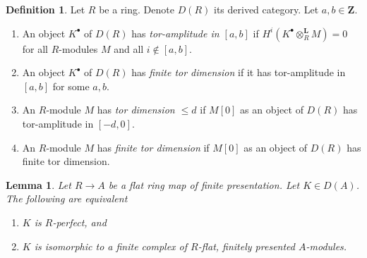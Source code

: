 \documentclass{amsart}
\theoremstyle{plain}
\newtheorem{lemma}[subsection]{Lemma}
\theoremstyle{definition}
\newtheorem{definition}[subsection]{Definition}
\theoremstyle{remark}
\numberwithin{equation}{subsection}
\begin{document}
\begin{definition}
\label{definition-tor-amplitude}
Let $R$ be a ring. Denote $D(R)$ its derived category.
Let $a, b \in \mathbf{Z}$.
\begin{enumerate}
\item An object $K^\bullet$ of $D(R)$ has
{\it tor-amplitude in $[a, b]$}
if $H^i(K^\bullet \otimes_R^\mathbf{L} M) = 0$ for all $R$-modules
$M$ and all $i \not \in [a, b]$.
\item An object $K^\bullet$ of $D(R)$ has {\it finite tor dimension}
if it has tor-amplitude in $[a, b]$ for some $a, b$.
\item An $R$-module $M$ has {\it tor dimension $\leq d$}
if $M[0]$ as an object of $D(R)$ has tor-amplitude in $[-d, 0]$.
\item An $R$-module $M$ has {\it finite tor dimension}
if $M[0]$ as an object of $D(R)$ has finite tor dimension.
\end{enumerate}
\end{definition}

\begin{lemma}
\label{lemma-structure-relatively-perfect}
Let $R \to A$ be a flat ring map of finite presentation.
Let $K \in D(A)$. The following are equivalent
\begin{enumerate}
\item $K$ is $R$-perfect, and
\item $K$ is isomorphic to a finite complex of $R$-flat,
finitely presented $A$-modules.
\end{enumerate}
\end{lemma}
\end{document}
